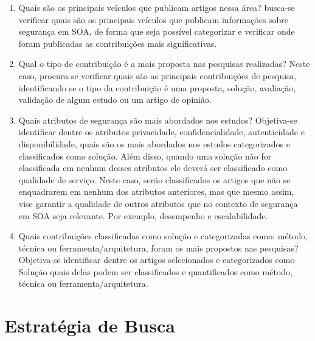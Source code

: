 \begin{enumerate}[ QP1 )]

    \item Quais são os principais veículos que publicam artigos nessa área?
      busca-se verificar quais são os principais veículos que publicam informações sobre segurança em SOA, de forma que seja possível categorizar e verificar onde foram publicadas as contribuições mais significativas.
	
	\item Qual o tipo de contribuição é a mais proposta nas pesquisas realizadas?
    Neste caso, procura-se verificar quais são as principais contribuições de pesquisa, identificando se o tipo da contribuição é uma proposta, solução, avaliação, validação de algum estudo ou um artigo de opinião.


	\item Quais atributos de segurança são mais abordados nos estudos? Objetiva-se identificar dentre os atributos privacidade, confidencialidade, autenticidade e disponibilidade,  quais são os mais abordados nos estudos categorizados e classificados como solução. Além disso, quando uma solução não for classificada em nenhum desses atributos ele deverá ser classificado como qualidade de serviço. Neste caso, serão classificados os artigos que não se enquadrarem em nenhum dos atributos anteriores, mas que mesmo assim, vise garantir a qualidade de outros atributos que no contexto de segurança em SOA seja relevante. Por exemplo, desempenho e escalabilidade.

    \item Quais contribuições classificadas como solução e categorizadas como: método, técnica ou ferramenta/arquitetura, foram os mais propostos nas pesquisas? Objetiva-se identificar dentre os artigos selecionados e categorizados como Solução quais delas podem ser classificados e quantificados como método, técnica ou ferramenta/arquitetura.



\end{enumerate}

\section{Estratégia de Busca}\label{sec:Obj1}

